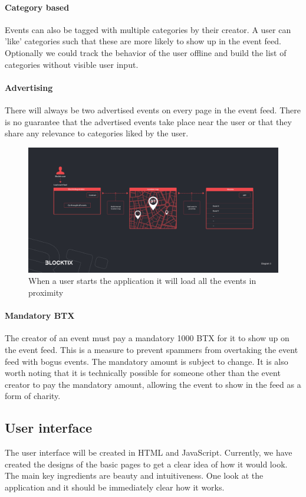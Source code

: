 \documentclass[a4paper]{article}
\begin{document}
\paragraph{Category based}Events can also be tagged with multiple categories by their creator. A user can 'like' categories such that these are more likely to show up in the event feed. Optionally we could track the behavior of the user offline and build the list of categories without visible user input.


\paragraph{Advertising} There will always be two advertised events on every page in the event feed. There is no guarantee that the advertised events take place near the user or that they share any relevance to categories liked by the user.

\begin{figure}
\centering
\includegraphics[scale=0.22]{BTX-Diagram-3.jpg}
\caption{\label{fig:BTX-Diagram-3}When a user starts the application it will load all the events in proximity}
\end{figure}

\paragraph{Mandatory BTX} The creator of an event must pay a mandatory 1000 BTX for it to show up on the event feed. This is a measure to prevent spammers from overtaking the event feed with bogus events. The mandatory amount is subject to change. It is also worth noting that it is technically possible for someone other than the event creator to pay the mandatory amount, allowing the event to show in the feed as a form of charity.


\subsection{User interface}
The user interface will be created in HTML and JavaScript. Currently, we have created the designs of the basic pages to get a clear idea of how it would look. The main key ingredients are beauty and intuitiveness. One look at the application and it should be immediately clear how it works. 
\end{document}
